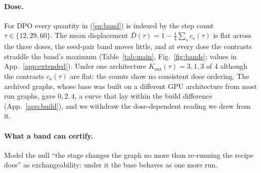 \documentclass{article}
\begin{document}
\paragraph{Dose.} For DPO every quantity in (\ref{eq:band}) is indexed by the step count $\tau\in\{12,29,60\}$. The mean displacement $\bar D(\tau)=1-\frac14\sum_s c_s(\tau)$ is flat across the three doses, the seed-pair band moves little, and at every dose the contrasts straddle the band's maximum (Table~\ref{tab:main}, Fig.~\ref{fig:bands}; values in App.~\ref{app:extended}). Under one architecture $K_{\mathrm{out}}(\tau)=3,1,3$ of $4$ although the contrasts $c_s(\tau)$ are flat: the counts show no consistent dose ordering. The archived graphs, whose base was built on a different GPU architecture from most run graphs, gave $0,2,4$, a curve that lay within the build difference (App.~\ref{app:build}), and we withdraw the dose-dependent reading we drew from it.

\paragraph{What a band can certify.} Model the null ``the stage changes the graph no more than re-running the recipe does'' as exchangeability: under it the base behaves as one more run.
\end{document}
